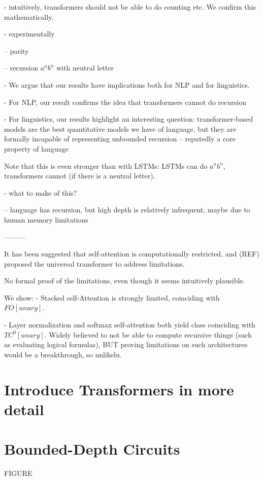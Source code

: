 \documentclass[11pt,a4paper]{article}
\begin{document}
- intuitively, transformers should not be able to do counting etc. We confirm this mathematically.

- experimentally

-- parity

-- recursion $a^nb^n$ with neutral letter

- We argue that our results have implications both for NLP and for linguistics.

- For NLP, our result confirms the idea that transformers cannot do recursion

- For linguistics, our results highlight an interesting question:
transformer-based models are the best quantitative models we have of language, but they are formally incapable of representing unbounded recursion -- reputedly a core property of language

Note that this is even stronger than with LSTMs:
LSTMs can do $a^nb^n$, transformers cannot (if there is a neutral letter).

- what to make of this?

-- language has recursion, but high depth is relatively infrequent, maybe due to human memory limitations



---------

It has been suggested that self-attention is computationally restricted, and (REF) proposed the universal transformer to address limitations.

No formal proof of the limitations, even though it seems intuitively plausible.

We show:
- Stacked self-Attention is strongly limited, coinciding with $FO[unary]$.

- Layer normalization and softmax self-attention both yield class coinciding with $TC^0[unary]$.
Widely believed to not be able to compute recursive things (such as evaluating logical formulas), BUT proving limitations on such architectures would be a breakthrough, so unlikelu.


\section{Introduce Transformers in more detail}

\section{Bounded-Depth Circuits}

FIGURE
\end{document}
